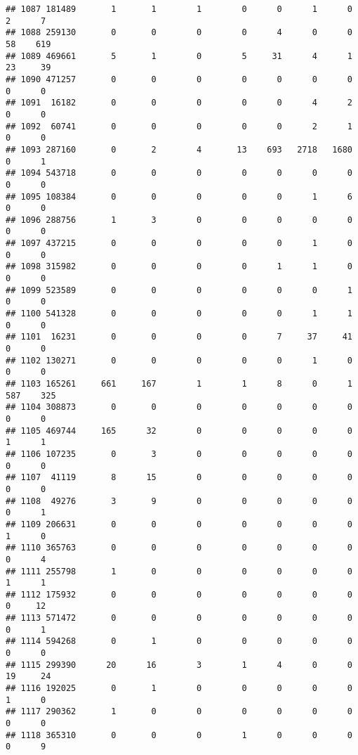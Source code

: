 \documentclass[
]{article}
\begin{document}
\begin{verbatim}
## 1087 181489       1       1        1        0      0      1      0     2      7
## 1088 259130       0       0        0        0      4      0      0    58    619
## 1089 469661       5       1        0        5     31      4      1    23     39
## 1090 471257       0       0        0        0      0      0      0     0      0
## 1091  16182       0       0        0        0      0      4      2     0      0
## 1092  60741       0       0        0        0      0      2      1     0      0
## 1093 287160       0       2        4       13    693   2718   1680     0      1
## 1094 543718       0       0        0        0      0      0      0     0      0
## 1095 108384       0       0        0        0      0      1      6     0      0
## 1096 288756       1       3        0        0      0      0      0     0      0
## 1097 437215       0       0        0        0      0      1      0     0      0
## 1098 315982       0       0        0        0      1      1      0     0      0
## 1099 523589       0       0        0        0      0      0      1     0      0
## 1100 541328       0       0        0        0      0      1      1     0      0
## 1101  16231       0       0        0        0      7     37     41     0      0
## 1102 130271       0       0        0        0      0      1      0     0      0
## 1103 165261     661     167        1        1      8      0      1   587    325
## 1104 308873       0       0        0        0      0      0      0     0      0
## 1105 469744     165      32        0        0      0      0      0     1      1
## 1106 107235       0       3        0        0      0      0      0     0      0
## 1107  41119       8      15        0        0      0      0      0     0      0
## 1108  49276       3       9        0        0      0      0      0     0      1
## 1109 206631       0       0        0        0      0      0      0     1      0
## 1110 365763       0       0        0        0      0      0      0     0      4
## 1111 255798       1       0        0        0      0      0      0     1      1
## 1112 175932       0       0        0        0      0      0      0     0     12
## 1113 571472       0       0        0        0      0      0      0     0      1
## 1114 594268       0       1        0        0      0      0      0     0      0
## 1115 299390      20      16        3        1      4      0      0    19     24
## 1116 192025       0       1        0        0      0      0      0     1      0
## 1117 290362       1       0        0        0      0      0      0     0      0
## 1118 365310       0       0        0        1      0      0      0     0      9

\end{verbatim}
\end{document}
